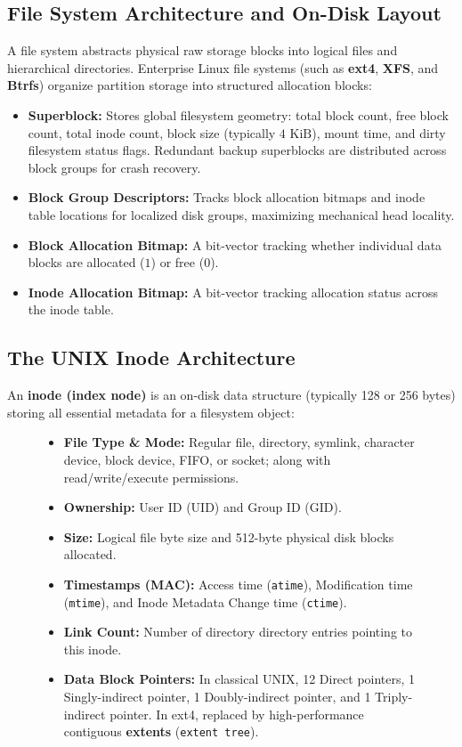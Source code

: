 \subsection{File System Architecture and On-Disk Layout}
A file system abstracts physical raw storage blocks into logical files and hierarchical directories. Enterprise Linux file systems (such as \textbf{ext4}, \textbf{XFS}, and \textbf{Btrfs}) organize partition storage into structured allocation blocks:
\begin{itemize}
    \item \textbf{Superblock:} Stores global filesystem geometry: total block count, free block count, total inode count, block size (typically $4\text{ KiB}$), mount time, and dirty filesystem status flags. Redundant backup superblocks are distributed across block groups for crash recovery.
    \item \textbf{Block Group Descriptors:} Tracks block allocation bitmaps and inode table locations for localized disk groups, maximizing mechanical head locality.
    \item \textbf{Block Allocation Bitmap:} A bit-vector tracking whether individual data blocks are allocated ($1$) or free ($0$).
    \item \textbf{Inode Allocation Bitmap:} A bit-vector tracking allocation status across the inode table.
\end{itemize}

\subsection{The UNIX Inode Architecture}
An \textbf{inode (index node)} is an on-disk data structure (typically 128 or 256 bytes) storing all essential metadata for a filesystem object:
\begin{figure}[htbp]
\centering
\begin{tcolorbox}[colback=codebg, colframe=primary, title=\textbf{Essential Inode Metadata Structure}]
\begin{itemize}
    \item \textbf{File Type \& Mode:} Regular file, directory, symlink, character device, block device, FIFO, or socket; along with read/write/execute permissions.
    \item \textbf{Ownership:} User ID (UID) and Group ID (GID).
    \item \textbf{Size:} Logical file byte size and 512-byte physical disk blocks allocated.
    \item \textbf{Timestamps (MAC):} Access time (\texttt{atime}), Modification time (\texttt{mtime}), and Inode Metadata Change time (\texttt{ctime}).
    \item \textbf{Link Count:} Number of directory directory entries pointing to this inode.
    \item \textbf{Data Block Pointers:} In classical UNIX, 12 Direct pointers, 1 Singly-indirect pointer, 1 Doubly-indirect pointer, and 1 Triply-indirect pointer. In ext4, replaced by high-performance contiguous \textbf{extents} (\texttt{extent tree}).
\end{itemize}
\end{tcolorbox}
\end{figure}

